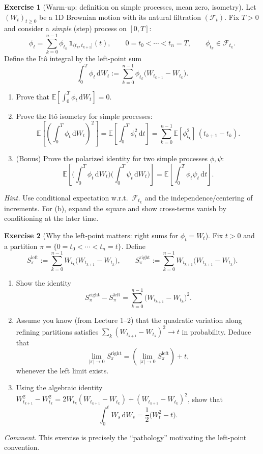 \documentclass[11pt]{article}
\newcommand{\E}{\mathbb{E}}
\newcommand{\F}{\mathcal{F}}
\newcommand{\1}{\mathbf{1}}
\theoremstyle{definition}
\newtheorem{exercise}{Exercise}[section]
\begin{document}
\begin{exercise}[Warm-up: definition on simple processes, mean zero, isometry]
Let $(W_t)_{t\ge 0}$ be a 1D Brownian motion with its natural filtration $(\F_t)$.
Fix $T>0$ and consider a \emph{simple} (step) process on $[0,T]$:
$$
\phi_t=\sum_{k=0}^{n-1}\phi_{t_k}\,\1_{(t_k,t_{k+1}]}(t),
\qquad 0=t_0<\cdots<t_n=T,\qquad \phi_{t_k}\in\F_{t_k}.
$$
Define the It\^o integral by the left-point sum
$$
\int_0^T \phi_t\,\mathrm{d} W_t
:=\sum_{k=0}^{n-1}\phi_{t_k}\big(W_{t_{k+1}}-W_{t_k}\big).
$$
\begin{enumerate}[label=\textbf{(\alph*)}, itemsep=0.25em]
\item Prove that $\E\!\left[\int_0^T \phi_t\,\mathrm{d} W_t\right]=0$.
\item Prove the It\^o isometry for simple processes:
$$
\E\!\left[\left(\int_0^T \phi_t\,\mathrm{d} W_t\right)^2\right]
=\E\!\left[\int_0^T \phi_t^2\,\mathrm{d} t\right]
=\sum_{k=0}^{n-1}\E[\phi_{t_k}^2]\,(t_{k+1}-t_k).
$$
\item (Bonus) Prove the polarized identity for two simple processes $\phi,\psi$:
$$
\E\!\left[\Big(\int_0^T \phi_t\,\mathrm{d} W_t\Big)\Big(\int_0^T \psi_t\,\mathrm{d} W_t\Big)\right]
=\E\!\left[\int_0^T \phi_t\psi_t\,\mathrm{d} t\right].
$$
\end{enumerate}

\smallskip
\noindent\textit{Hint.}
Use conditional expectation w.r.t.\ $\F_{t_k}$ and the independence/centering of increments.
For (b), expand the square and show cross-terms vanish by conditioning at the later time.
\end{exercise}

\begin{exercise}[Why the left-point matters: right sums for $\phi_t=W_t$]
Fix $t>0$ and a partition $\pi=\{0=t_0<\cdots<t_n=t\}$.
Define
$$
S^{\text{left}}_\pi:=\sum_{k=0}^{n-1}W_{t_k}\big(W_{t_{k+1}}-W_{t_k}\big),
\qquad
S^{\text{right}}_\pi:=\sum_{k=0}^{n-1}W_{t_{k+1}}\big(W_{t_{k+1}}-W_{t_k}\big).
$$
\begin{enumerate}[label=\textbf{(\alph*)}, itemsep=0.25em]
\item Show the identity
$$
S^{\text{right}}_\pi - S^{\text{left}}_\pi
=\sum_{k=0}^{n-1}\big(W_{t_{k+1}}-W_{t_k}\big)^2.
$$
\item Assume you know (from Lecture 1--2) that the quadratic variation along refining partitions satisfies
$\sum_{k} (W_{t_{k+1}}-W_{t_k})^2 \to t$ in probability.
Deduce that
$$
\lim_{|\pi|\to 0} S^{\text{right}}_\pi
=
\left(\lim_{|\pi|\to 0} S^{\text{left}}_\pi\right)+t,
$$
whenever the left limit exists.
\item Using the algebraic identity
$W_{t_{k+1}}^2 - W_{t_k}^2
= 2W_{t_k}(W_{t_{k+1}}-W_{t_k}) + (W_{t_{k+1}}-W_{t_k})^2$,
show that
$$
\int_0^t W_s\,\mathrm{d} W_s
=\frac12\big(W_t^2 - t\big).
$$
\end{enumerate}

\smallskip
\noindent\textit{Comment.}
This exercise is precisely the “pathology” motivating the left-point convention. %
\end{exercise}
\end{document}
